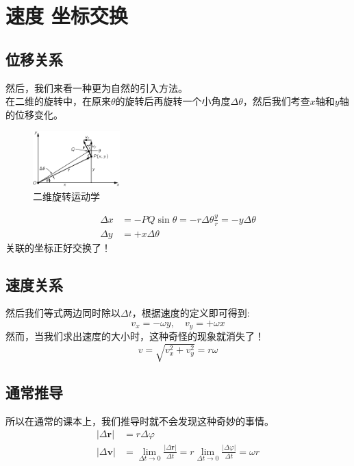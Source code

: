 
\chapter{速度 坐标交换}
\section{位移关系}
然后，我们来看一种更为自然的引入方法。\\
在二维的旋转中，在原来$\theta$的旋转后再旋转一个小角度$\Delta\theta$，然后我们考查$x$轴和$y$轴的位移变化。

\begin{figure}
  \centering
  \includegraphics[width=0.3\textwidth]{pic1.png}
  \caption{二维旋转运动学}\label{1}
\end{figure}
\begin{align}
\Delta x & =-PQ \sin\theta=-r\Delta\theta \frac{y}{r}=-y\Delta\theta \\
\Delta y & =+x\Delta\theta
\end{align}
关联的坐标正好交换了！\\
\section{速度关系}
然后我们等式两边同时除以$\Delta t$，根据速度的定义即可得到:
  \begin{equation}
    v_x=-\omega y,\quad  v_y=+\omega x
  \end{equation}
然而，当我们求出速度的大小时，这种奇怪的现象就消失了！
\begin{equation}
  v=\sqrt{v_x^2+v_y^2}=r\omega
\end{equation}
\section{通常推导}
所以在通常的课本上，我们推导时就不会发现这种奇妙的事情。
\begin{align}
  |\Delta \bm{r}|& =r\Delta\varphi \\
  |\Delta \bm{v}|& =\lim_{\Delta t \rightarrow 0} \frac{|\Delta \bm{r}|}{\Delta t}= r \lim_{\Delta t \rightarrow 0}\frac{|\Delta \varphi|}{\Delta t}= \omega r
\end{align}

